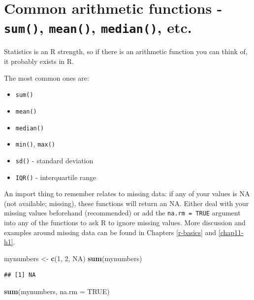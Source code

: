 \documentclass[
  12pt,
  krantz2]{krantz}
\makeatletter
\newenvironment{Shaded}{\begin{snugshade}}{\end{snugshade}}
\newcommand{\DataTypeTok}[1]{\textcolor[rgb]{0.13,0.29,0.53}{#1}}
\newcommand{\DecValTok}[1]{\textcolor[rgb]{0.00,0.00,0.81}{#1}}
\newcommand{\KeywordTok}[1]{\textcolor[rgb]{0.13,0.29,0.53}{\textbf{#1}}}
\newcommand{\NormalTok}[1]{#1}
\newcommand{\OtherTok}[1]{\textcolor[rgb]{0.56,0.35,0.01}{#1}}
\newcommand{\StringTok}[1]{\textcolor[rgb]{0.31,0.60,0.02}{#1}}
\providecommand{\tightlist}{%
  \setlength{\itemsep}{0pt}\setlength{\parskip}{0pt}}
\newenvironment{kframe}{%
\medskip{}
\setlength{\fboxsep}{.8em}
 \def\at@end@of@kframe{}%
 \ifinner\ifhmode%
  \def\at@end@of@kframe{\end{minipage}}%
  \begin{minipage}{\columnwidth}%
 \fi\fi%
 \def\FrameCommand##1{\hskip\@totalleftmargin \hskip-\fboxsep
 \colorbox{shadecolor}{##1}\hskip-\fboxsep
     \hskip-\linewidth \hskip-\@totalleftmargin \hskip\columnwidth}%
 \MakeFramed {\advance\hsize-\width
   \@totalleftmargin\z@ \linewidth\hsize
   \@setminipage}}%
 {\par\unskip\endMakeFramed%
 \at@end@of@kframe}
\renewenvironment{Shaded}{\begin{kframe}}{\end{kframe}}
\makeatother
\begin{document}
\hypertarget{common-arithmetic-functions---sum-mean-median-etc.}{%
\section{\texorpdfstring{Common arithmetic functions - \texttt{sum()}, \texttt{mean()}, \texttt{median()}, etc.}{Common arithmetic functions - sum(), mean(), median(), etc.}}\label{common-arithmetic-functions---sum-mean-median-etc.}}


Statistics is an R strength, so if there is an arithmetic function you can think of, it probably exists in R.

The most common ones are:

\begin{itemize}
\tightlist
\item
  \texttt{sum()}
\item
  \texttt{mean()}
\item
  \texttt{median()}
\item
  \texttt{min()}, \texttt{max()}
\item
  \texttt{sd()} - standard deviation
\item
  \texttt{IQR()} - interquartile range
\end{itemize}

An import thing to remember relates to missing data: if any of your values is NA (not available; missing), these functions will return an NA.
Either deal with your missing values beforehand (recommended) or add the \texttt{na.rm\ =\ TRUE} argument into any of the functions to ask R to ignore missing values.
More discussion and examples around missing data can be found in Chapters \ref{r-basics} and \ref{chap11-h1}.

\begin{Shaded}
\begin{Highlighting}[]
\NormalTok{mynumbers <-}\StringTok{ }\KeywordTok{c}\NormalTok{(}\DecValTok{1}\NormalTok{, }\DecValTok{2}\NormalTok{, }\OtherTok{NA}\NormalTok{)}
\KeywordTok{sum}\NormalTok{(mynumbers)}
\end{Highlighting}
\end{Shaded}

\begin{verbatim}
## [1] NA
\end{verbatim}

\begin{Shaded}
\begin{Highlighting}[]
\KeywordTok{sum}\NormalTok{(mynumbers, }\DataTypeTok{na.rm =} \OtherTok{TRUE}\NormalTok{)}
\end{Highlighting}
\end{Shaded}
\end{document}
